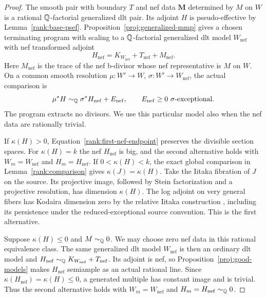 \begin{proof}
The smooth pair with boundary \(T\) and nef data \(\boldsymbol M\)
determined by \(M\) on \(W\) is a rational \(\mathbb Q\)-factorial
generalized dlt pair.  Its adjoint \(H\) is pseudo-effective by
Lemma~\ref{rank:base-psef}.  Proposition~\ref{proj:generalized-mmp}
gives a chosen terminating program with scaling to a
\(\mathbb Q\)-factorial generalized dlt model \(W_{\mathrm{nef}}\) with nef transformed
adjoint
\[
 H_{\mathrm{nef}}
     =K_{W_{\mathrm{nef}}}+T_{\mathrm{nef}}+M_{\mathrm{nef}}.
\]
Here \(M_{\mathrm{nef}}\) is the trace of the nef b-divisor whose nef
representative is \(M\) on \(W\).  On a common smooth resolution
\(\mu:W'\to W\), \(\sigma:W'\to W_{\mathrm{nef}}\), the actual comparison is
\begin{equation}
 \mu^*H\sim_{\mathbb Q}\sigma^*H_{\mathrm{nef}}+E_{\mathrm{nef}},
 \qquad E_{\mathrm{nef}}\geq0\ \text{\(\sigma\)-exceptional}.
\label{rank:first-nef-endpoint}
\end{equation}
The program extracts no divisors.  We use this particular model also when
the nef data are rationally trivial.

If \(\kappa(H)>0\), Equation~\eqref{rank:first-nef-endpoint} preserves
the divisible section spaces.  For \(\kappa(H)=k\) the nef
\(H_{\mathrm{nef}}\) is big, and the second alternative holds with
\(W_m=W_{\mathrm{nef}}\) and \(H_m=H_{\mathrm{nef}}\).  If
\(0<\kappa(H)<k\), the exact global comparison in
Lemma~\ref{rank:comparison} gives \(\kappa(J)=\kappa(H)\).
Take the Iitaka fibration of \(J\) on the source.  Its projective
image, followed by Stein factorization and a projective resolution,
has dimension \(\kappa(H)\).  The log adjoint on very general
fibers has Kodaira dimension zero by the relative Iitaka construction
\cite[Lemma~2.6]{CI}, including its persistence under the
reduced-exceptional source convention.  This is the first alternative.

Suppose \(\kappa(H)\leq0\) and \(M\sim_{\mathbb Q}0\).  We may choose zero
nef data in this rational equivalence class.  The same generalized
dlt model \(W_{\mathrm{nef}}\) is then an ordinary dlt model and
\(H_{\mathrm{nef}}\sim_{\mathbb Q}K_{W_{\mathrm{nef}}}+T_{\mathrm{nef}}\).
Its adjoint is nef, so
Proposition~\ref{proj:good-models} makes \(H_{\mathrm{nef}}\) semiample as an
actual rational line.  Since
\(\kappa(H_{\mathrm{nef}})=\kappa(H)\leq0\), a generated multiple has
constant image and is trivial.  Thus the second alternative holds with
\(W_m=W_{\mathrm{nef}}\) and \(H_m=H_{\mathrm{nef}}\sim_{\mathbb Q}0\).


\end{proof}
